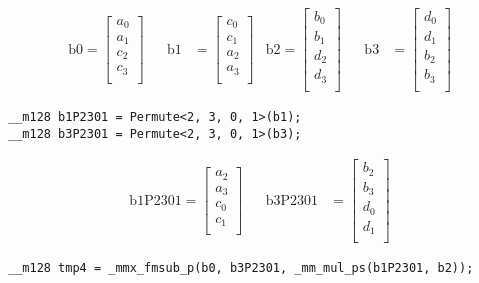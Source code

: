 \documentclass[]{scrartcl}
\begin{document}
\begin{align*}
\mathrm{b0} 
=
\begin{bmatrix}
a_0\\
a_1\\
c_2\\
c_3\\
\end{bmatrix}
&&
\mathrm{b1} 
&=
\begin{bmatrix}
c_0\\
c_1\\
a_2\\
a_3\\
\end{bmatrix}
&
\mathrm{b2} 
=
\begin{bmatrix}
b_0\\
b_1\\
d_2\\
d_3\\
\end{bmatrix}
&&
\mathrm{b3} 
&=
\begin{bmatrix}
d_0\\
d_1\\
b_2\\
b_3\\
\end{bmatrix}
\end{align*}

\begin{verbatim}
__m128 b1P2301 = Permute<2, 3, 0, 1>(b1);
__m128 b3P2301 = Permute<2, 3, 0, 1>(b3);
\end{verbatim}

\begin{align*}
\mathrm{b1P2301} 
=
\begin{bmatrix}
a_2\\
a_3\\
c_0\\
c_1\\
\end{bmatrix}
&&
\mathrm{b3P2301} 
&=
\begin{bmatrix}
b_2\\
b_3\\
d_0\\
d_1\\
\end{bmatrix}
\end{align*}


\begin{verbatim}
__m128 tmp4 = _mmx_fmsub_p(b0, b3P2301, _mm_mul_ps(b1P2301, b2));
\end{verbatim}
\end{document}

